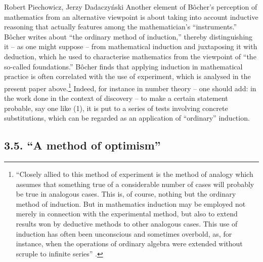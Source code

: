 \begin{artengenv}{Robert Piechowicz, Jerzy Dadaczyński}
Another element of Bôcher's perception of mathematics from an alternative viewpoint is about taking into account inductive reasoning that actually features among the mathematician's ``instruments.'' Bôcher writes about ``the ordinary method of induction,'' thereby distinguishing it -- as one might suppose -- from mathematical induction and juxtaposing it with deduction, which he used to characterise mathematics from the viewpoint of ``the so-called foundations.'' Bôcher finds that applying induction in mathematical practice is often correlated with the use of experiment, which is analysed in the present paper above.\footnote{``Closely allied to this method of experiment is the method of analogy which assumes that something true of a considerable number of cases will probably be true in analogous cases. This is, of course, nothing but the ordinary method of induction. But in mathematics induction may be employed not merely in connection with the experimental method, but also to extend results won by deductive methods to other analogous cases. This use of induction has often been unconscious and sometimes overbold, as, for instance, when the operations of ordinary algebra were extended without scruple to infinite series''
\parencite[][p.134]{bocher_fundamental_1904}.%
} Indeed, for instance in number theory -- one should add: in the work done in the context of discovery -- to make a certain statement probable, say one like (1), it is put to a series of tests involving concrete substitutions, which can be regarded as an application of ``ordinary'' induction.

\subsection{3.5. ``A method of optimism''}


\end{artengenv}

